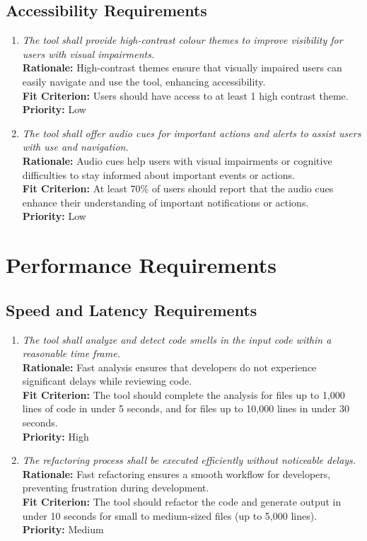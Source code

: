 \documentclass[12pt]{article}
\begin{document}
\subsection{Accessibility Requirements}
\begin{enumerate}[label=UHR-ACS \arabic*., wide=0pt, leftmargin=*]
    \item \emph{The tool shall provide high-contrast colour themes to improve visibility for users with visual impairments.}\\[2mm]
    {\bf Rationale:} High-contrast themes ensure that visually impaired users can easily navigate and use the tool, enhancing accessibility.\\
    {\bf Fit Criterion:} Users should have access to at least 1 high contrast theme.\\
    {\bf Priority:} Low
    \item \emph{The tool shall offer audio cues for important actions and alerts to assist users with use and navigation.}\\[2mm]
    {\bf Rationale:} Audio cues help users with visual impairments or cognitive difficulties to stay informed about important events or actions.\\
    {\bf Fit Criterion:} At least 70\% of users should report that the audio cues enhance their understanding of important notifications or actions.\\
    {\bf Priority:} Low
\end{enumerate}

\section{Performance Requirements}
\subsection{Speed and Latency Requirements}
\begin{enumerate}[label=PR-SL \arabic*., wide=0pt, leftmargin=*]
    \item \emph{The tool shall analyze and detect code smells in the input code within a reasonable time frame.}\\[2mm]
    {\bf Rationale:} Fast analysis ensures that developers do not experience significant delays while reviewing code.\\
    {\bf Fit Criterion:} The tool should complete the analysis for files up to 1,000 lines of code in under 5 seconds, and for files up to 10,000 lines in under 30 seconds.\\
    {\bf Priority:} High
    \item \emph{The refactoring process shall be executed efficiently without noticeable delays.}\\[2mm]
    {\bf Rationale:} Fast refactoring ensures a smooth workflow for developers, preventing frustration during development.\\
    {\bf Fit Criterion:} The tool should refactor the code and generate output in under 10 seconds for small to medium-sized files (up to 5,000 lines).\\
    {\bf Priority:} Medium
\end{enumerate}
\end{document}
